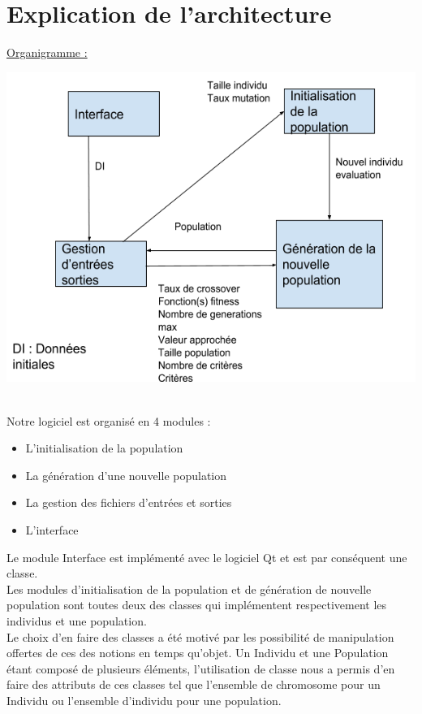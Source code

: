 \documentclass[a4paper,11pt]{article}
\begin{document}
	\section{Explication de l’architecture}
		\underline{Organigramme :}\\
		\centerline{\includegraphics[scale = 0.5]{OrganigrammeV9.png}}\\
		
		Notre logiciel est organisé en 4 modules :\\
		\begin{itemize}
			\item L’initialisation de la population
			\item La génération d’une nouvelle population
			\item La gestion des fichiers d’entrées et sorties
			\item L’interface\\
		\end{itemize}
		Le module Interface est implémenté avec le logiciel Qt et est par conséquent une classe.\\
		Les modules d’initialisation de la population et de génération de nouvelle population sont toutes deux des classes qui implémentent respectivement les individus et une population.\\
		Le choix d’en faire des classes a été motivé par les possibilité de manipulation offertes de ces des notions en temps qu’objet.
		Un Individu et une Population étant composé de plusieurs éléments, l’utilisation de classe nous a permis d’en faire des attributs de ces classes tel que l’ensemble de chromosome pour un Individu ou l’ensemble d’individu pour une population.\\\\
		
\end{document}
